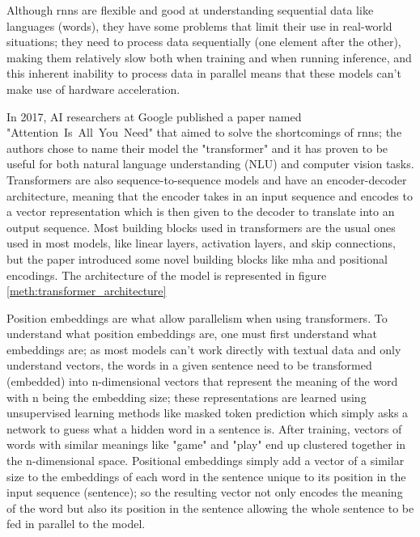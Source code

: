 Although \gls{rnn}s are flexible and good at understanding sequential data like languages (words), they have some problems that limit their use in real-world situations; they need to process data sequentially (one element after the other), making them relatively slow both when training and when running inference, and this inherent inability to process data in parallel means that these models can't make use of hardware acceleration.

In 2017, AI researchers at Google published a paper named \\ \mbox{"Attention Is All You Need"} \cite{vaswani_attention_2017} that aimed to solve the shortcomings of \gls{rnn}s; the authors chose to name their model the "transformer" and it has proven to be useful for both natural language understanding (NLU) and computer vision tasks. Transformers are also sequence-to-sequence models and have an encoder-decoder architecture, meaning that the encoder takes in an input sequence and encodes to a vector representation which is then given to the decoder to translate into an output sequence. Most building blocks used in transformers are the usual ones used in most models, like linear layers, activation layers, and skip connections, but the paper introduced some novel building blocks like \gls{mha} and positional encodings. The architecture of the model is represented in figure \ref{meth:transformer_architecture}

Position embeddings are what allow parallelism when using transformers. To understand what position embeddings are, one must first understand what embeddings are; as most models can't work directly with textual data and only understand vectors, the words in a given sentence need to be transformed (embedded) into n-dimensional vectors that represent the meaning of the word with n being the embedding size; these representations are learned using unsupervised learning methods like masked token prediction which simply asks a network to guess what a hidden word in a sentence is. After training, vectors of words with similar meanings like "game" and "play" end up clustered together in the n-dimensional space. Positional embeddings simply add a vector of a similar size to the embeddings of each word in the sentence unique to its position in the input sequence (sentence); so the resulting vector not only encodes the meaning of the word but also its position in the sentence allowing the whole sentence to be fed in parallel to the model.

